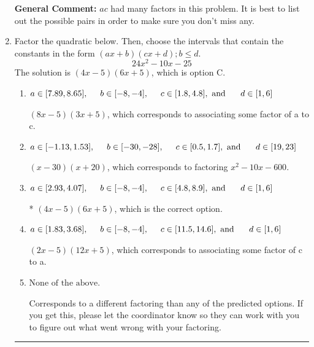 \documentclass{extbook}[14pt]
\newcommand{\litem}[1]{\item #1

\rule{\textwidth}{0.4pt}}
\begin{document}
\begin{enumerate}
{\textbf{General Comment:} $ac$ had many factors in this problem. It is best to list out the possible pairs in order to make sure you don't miss any.
}
\litem{
Factor the quadratic below. Then, choose the intervals that contain the constants in the form $(ax+b)(cx+d); b \leq d.$
\[ 24x^{2} -10 x -25 \]The solution is \( (4x -5)(6x + 5) \), which is option C.\begin{enumerate}[label=\Alph*.]
\item \( a \in [7.89, 8.65], \hspace*{5mm} b \in [-8, -4], \hspace*{5mm} c \in [1.8, 4.8], \text{ and } \hspace*{5mm} d \in [1, 6] \)

 $(8x -5)(3x + 5)$, which corresponds to associating some factor of a to c.
\item \( a \in [-1.13, 1.53], \hspace*{5mm} b \in [-30, -28], \hspace*{5mm} c \in [0.5, 1.7], \text{ and } \hspace*{5mm} d \in [19, 23] \)

 $(x -30)(x + 20)$, which corresponds to factoring $x^{2} -10 x -600$.
\item \( a \in [2.93, 4.07], \hspace*{5mm} b \in [-8, -4], \hspace*{5mm} c \in [4.8, 8.9], \text{ and } \hspace*{5mm} d \in [1, 6] \)

* $(4x -5)(6x + 5)$, which is the correct option.
\item \( a \in [1.83, 3.68], \hspace*{5mm} b \in [-8, -4], \hspace*{5mm} c \in [11.5, 14.6], \text{ and } \hspace*{5mm} d \in [1, 6] \)

 $(2x -5)(12x + 5)$, which corresponds to associating some factor of c to a.
\item \( \text{None of the above.} \)

 Corresponds to a different factoring than any of the predicted options. If you get this, please let the coordinator know so they can work with you to figure out what went wrong with your factoring.
\end{enumerate}

}
\end{enumerate}
\end{document}

